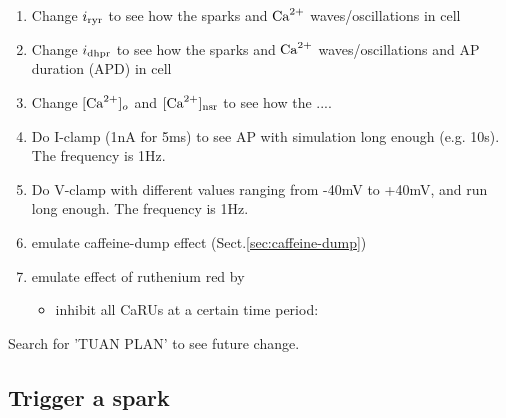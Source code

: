 \begin{enumerate}
\item Change $i_{\text{ryr}}$ to see how the sparks and ${\text{Ca}^{2+}}$
  waves/oscillations in cell
\item Change $i_{\text{dhpr}}$ to see how the sparks and ${\text{Ca}^{2+}}$
  waves/oscillations and AP duration (APD) in cell

\item Change $[{\text{Ca}^{2+}}]_o$ and $[{\text{Ca}^{2+}}]_{\text{nsr}}$ to see how the ....

\item Do I-clamp (1nA for 5ms) to see AP with simulation long enough
  (e.g. 10s). The frequency is 1Hz.

\item Do V-clamp with different values ranging from -40mV to +40mV,
  and run long enough. The frequency is 1Hz.

\item emulate caffeine-dump effect (Sect.\ref{sec:caffeine-dump}) 
\item emulate effect of ruthenium red by
  \begin{itemize}
  \item inhibit all CaRUs at a certain time period: 
  \end{itemize}
\end{enumerate}


Search for 'TUAN PLAN' to see future change.

\subsection{Trigger a spark}
\label{sec:spark_trigger}


